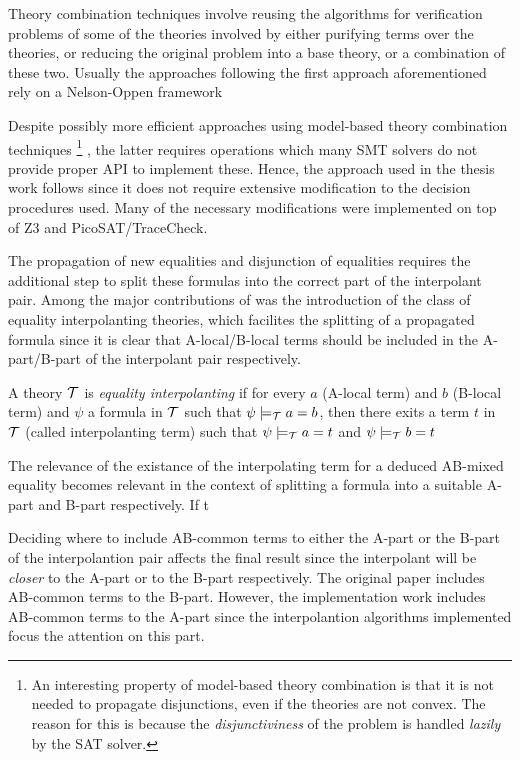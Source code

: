 Theory combination techniques involve 
reusing the algorithms for verification 
problems of some of the theories involved 
by either purifying terms over the 
theories, or reducing the original problem 
into a base theory, or a combination of these two. 
Usually the approaches following the first approach 
aforementioned rely on a Nelson-Oppen
framework \cite{10.1007/11532231_26, 
10.1007/978-3-642-22119-4_1, 10.1145/2490253}

Despite possibly more efficient approaches using
model-based theory combination techniques 
\footnote{
  An interesting property of model-based theory combination 
  is that it is not needed to propagate disjunctions, even if
  the theories are not convex. The reason for this is because
  the \emph{disjunctiviness} of the problem is handled 
  \emph{lazily} by the
  SAT solver.
} \cite{10.1007/978-3-642-22119-4_1}, the latter requires 
operations which many SMT solvers do not provide 
proper API to implement these.
Hence, the approach used in the thesis work follows 
\cite{10.1007/11532231_26} since it does not require extensive
modification to the decision procedures
used. Many of the necessary modifications 
were implemented on top of Z3 and PicoSAT/TraceCheck.

The propagation of new equalities and disjunction of equalities
requires the additional step to split these formulas into
the correct part of the interpolant pair. Among the major
contributions of \cite{10.1007/11532231_26} was the introduction
of the class of equality interpolanting theories, which
facilites the splitting of a propagated formula since
it is clear that A-local/B-local terms should be included in the
A-part/B-part of the interpolant pair respectively.

\begin{definition}
  A theory $\cal{T}$ is \emph{equality interpolanting}
  if for every $a$ (A-local term) and  $b$ (B-local term)
  and $\psi$ a formula in $\cal{T}$ such that
  $\psi \models_{\cal{T}} a = b$, then there exits a term $t$
  in $\cal{T}$ (called interpolanting term)
  such that $\psi \models_{\cal{T}} a = t$ and 
  $\psi \models_{\cal{T}} b = t$
\end{definition}

The relevance of the existance of the interpolating term for 
a deduced AB-mixed equality becomes relevant in the context 
of splitting a formula into a suitable A-part and B-part 
respectively. If t

Deciding where to include AB-common terms to either the 
A-part or the B-part of the interpolantion pair affects 
the final result since the interpolant will be \emph{closer} 
to the A-part or to the B-part respectively. The original
paper includes AB-common terms to the B-part. However,
the implementation work includes AB-common terms to the
A-part since the interpolantion algorithms implemented
focus the attention on this part.

